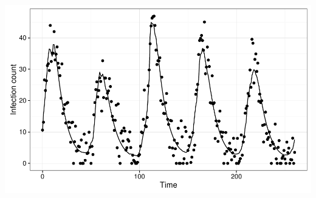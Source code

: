 \documentclass[12pt]{beamer}
\begin{document}
\begin{frame}

	\null
	\vfill
	\includegraphics[width=\textwidth,height=\textheight,keepaspectratio=true]{../../writing/SIRS-SMAP/images/dataplot}
	\vfill

\end{frame}
\end{document}
